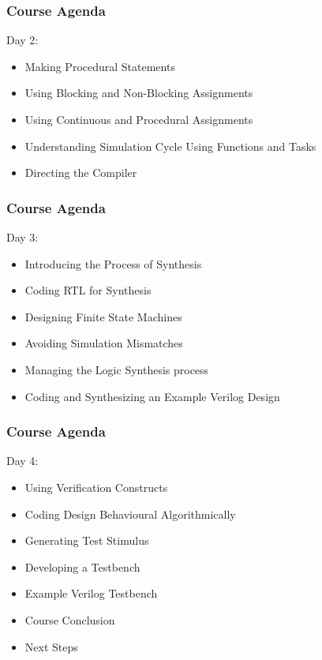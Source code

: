 \documentclass[t]{beamer}
\begin{document}
\begin{frame}
\frametitle{Course Agenda}
Day 2:
\begin{itemize}
\item Making Procedural Statements
\item Using Blocking and Non-Blocking Assignments
\item Using Continuous and Procedural Assignments
\item Understanding Simulation Cycle
Using Functions and Tasks
\item Directing the Compiler
\end{itemize}


\end{frame}

\begin{frame}
\frametitle{Course Agenda}
Day 3:
\begin{itemize}
\item Introducing the Process of Synthesis
\item Coding RTL for Synthesis
\item Designing Finite State Machines
\item Avoiding Simulation Mismatches
\item Managing the Logic Synthesis process
\item Coding and Synthesizing an Example Verilog Design
\end{itemize}


\end{frame}

\begin{frame}
\frametitle{Course Agenda}
Day 4:
\begin{itemize}
\item Using Verification Constructs
\item Coding Design Behavioural Algorithmically
\item Generating Test Stimulus
\item Developing a Testbench
\item Example Verilog Testbench
\item Course Conclusion
\item Next Steps
\end{itemize}


\end{frame}
\end{document}
